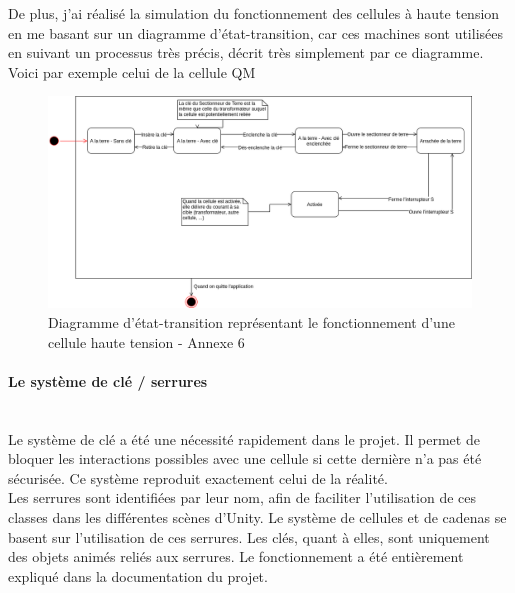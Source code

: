 \documentclass[a4paper]{article}
\begin{document}
    \newpage

    De plus, j'ai réalisé la simulation du fonctionnement des cellules à haute tension en me basant sur un diagramme d'état-transition, car ces machines sont utilisées en suivant un processus très précis, décrit très simplement par ce diagramme. Voici par exemple celui de la cellule QM \\

    \begin{figure}[H]
        \centering
        \includegraphics[scale=0.35]{img/DiagEtatTransitionQM}
        \caption{Diagramme d'état-transition représentant le fonctionnement d'une cellule haute tension - Annexe 6}
    \end{figure} 

    \paragraph{Le système de clé / serrures} \mbox{} \\

    Le système de clé a été une nécessité rapidement dans le projet. Il permet de bloquer les interactions possibles avec une cellule si cette dernière n'a pas été sécurisée. Ce système reproduit exactement celui de la réalité. \\

    Les serrures sont identifiées par leur nom, afin de faciliter l'utilisation de ces classes dans les différentes scènes d'Unity. Le système de cellules et de cadenas se basent sur l'utilisation de ces serrures. Les clés, quant à elles, sont uniquement des objets animés reliés aux serrures. Le fonctionnement a été entièrement expliqué dans la documentation du projet. \\
    
\end{document}

